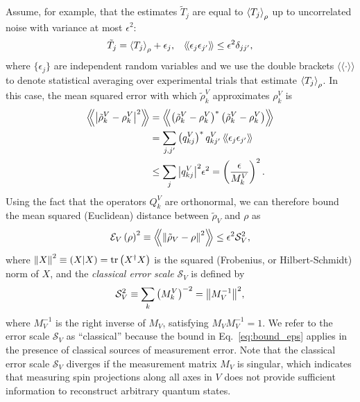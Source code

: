 \documentclass[notitlepage,twocolumn]{revtex4-2}
\newcommand{\f}[2]{\dfrac{#1}{#2}} %
\newcommand{\p}[1]{\left(#1\right)} %
\newcommand{\bk}{\Braket} %
\renewcommand{\set}[1]{\{#1\}} %
\newcommand{\bbk}[1]{\langle\!\langle #1 \rangle\!\rangle}
\newcommand{\Bbk}[1]
{\left\langle\!\!\left\langle #1 \right\rangle\!\!\right\rangle}
\newcommand{\E}{\mathcal{E}}
\renewcommand{\S}{\mathcal{S}}
\def\obk#1{\mathinner{({#1})}}
\begin{document}
Assume, for example, that the estimates $\tilde T_j$ are equal to $\bk{T_j}_\rho$ up to uncorrelated noise with variance at most $\epsilon^2$:
\begin{align}
  \tilde T_j = \bk{T_j}_\rho + \epsilon_j,
  &&
  \bbk{\epsilon_j \epsilon_{j'}} \le \epsilon^2 \delta_{jj'},
  \label{eq:error_assumption}
\end{align}
where $\set{\epsilon_j}$ are independent random variables and we use the double brackets $\bbk{\cdot}$ to denote statistical averaging over experimental trials that estimate $\bk{T_j}_\rho$.
In this case, the mean squared error with which $\tilde\rho^V_k$ approximates $\rho^V_k$ is
\begin{align}
  \Bbk{\abs{\tilde\rho^V_k-\rho^V_k}^2}
  &= \Bbk{\p{\tilde\rho^V_k-\rho^V_k}^*\p{\tilde\rho^V_k-\rho^V_k}} \\
  &= \sum_{j,j'} \p{q^V_{kj}}^* q^V_{kj'}\,
  \bbk{\epsilon_j \epsilon_{j'}} \\
  &\le \sum_j \abs{q^V_{kj}}^2 \epsilon^2
  = \p{\f{\epsilon}{M^V_k}}^2.
\end{align}
Using the fact that the operators $Q^V_k$ are orthonormal, we can therefore bound the mean squared (Euclidean) distance between $\tilde\rho_V$ and $\rho$ as
\begin{align}
  \E_V\p{\rho}^2
  \equiv \Bbk{\norm{\tilde\rho_V-\rho}^2}
  \le \epsilon^2 \S_V^2,
  \label{eq:bound_eps}
\end{align}
where $\norm{X}^2 \equiv \obk{X|X} = \tr\p{X^\dag X}$ is the squared (Frobenius, or Hilbert-Schmidt) norm of $X$, and the {\it classical error scale} $\S_V$ is defined by
\begin{align}
  \S_V^2 \equiv \sum_k \p{M^V_k}^{-2} = \norm{M_V^{-1}}^2,
\end{align}
where $M_V^{-1}$ is the right inverse of $M_V$, satisfying $M_V M_V^{-1}=1$.
We refer to the error scale $\S_V$ as ``classical'' because the bound in Eq.~\eqref{eq:bound_eps} applies in the presence of classical sources of measurement error.
Note that the classical error scale $\S_V$ diverges if the measurement matrix $M_V$ is singular, which indicates that measuring spin projections along all axes in $V$ does not provide sufficient information to reconstruct arbitrary quantum states.
\end{document}
